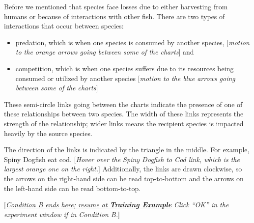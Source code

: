 {{{{\begin{minipage}{\textwidth}
{Before we mentioned that species face losses due to either harvesting from humans or because of interactions with other fish.  There are two types of interactions that occur between species:

\begin{itemize}
\item predation, which is when one species is consumed by another species, [\textit{motion to the orange arrows going between some of the charts}] and
\item competition, which is when one species suffers due to its resources being consumed or utilized by another species [\textit{motion to the blue arrows going between some of the charts}]
\end{itemize}

These semi-circle links going between the charts indicate the presence of one of these relationships between two species.  The width of these links represents the strength of the relationship; wider links means the recipient species is impacted heavily by the source species.

The direction of the links is indicated by the triangle in the middle.  For example, Spiny Dogfish eat cod. [\textit{Hover over the Spiny Dogfish to Cod link, which is the largest orange one on the right.}]  Additionally, the links are drawn clockwise, so the arrows on the right-hand side can be read top-to-bottom and the arrows on the left-hand side can be read bottom-to-top.

[\underline{\textit{Condition B ends here; resume at \textbf{Training Example}}} \textit{Click ``OK'' in the experiment window if in Condition B.}]
}
\end{minipage}
}


}}}
